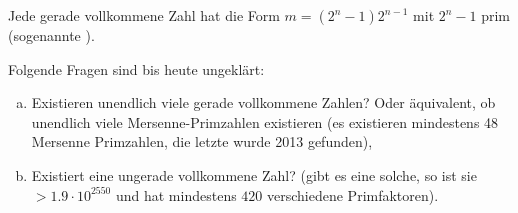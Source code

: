 \begin{st*}
	Jede gerade vollkommene Zahl hat die Form $m = (2^n-1) 2^{n-1}$ mit $2^n - 1$ prim (sogenannte ).
\end{st*}

\begin{nt*}
	Folgende Fragen sind bis heute ungeklärt:
	\begin{enumerate}[a)]
		\item
			Existieren unendlich viele gerade vollkommene Zahlen?
			Oder äquivalent, ob unendlich viele Mersenne-Primzahlen existieren (es existieren mindestens 48 Mersenne Primzahlen, die letzte wurde 2013 gefunden),
		\item
			Existiert eine ungerade vollkommene Zahl?
			(gibt es eine solche, so ist sie $> 1.9 \cdot 10^{2550}$ und hat mindestens $420$ verschiedene Primfaktoren).
	\end{enumerate}
\end{nt*}










